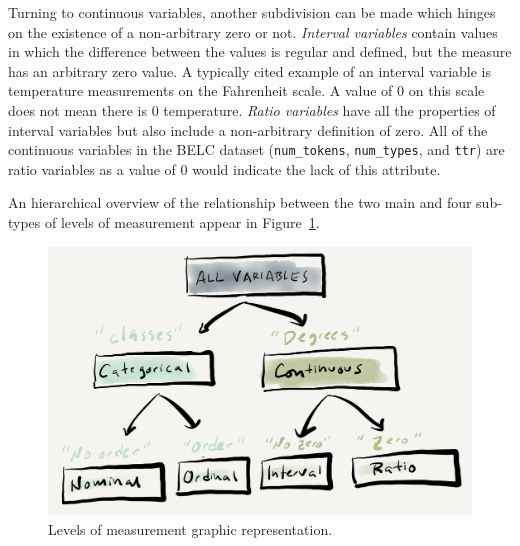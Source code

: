 \documentclass[
  letterpaper,
]{scrbook}
\begin{document}
Turning to continuous variables, another subdivision can be made which
hinges on the existence of a non-arbitrary zero or not. \emph{Interval
variables} contain values in which the difference between the values is
regular and defined, but the measure has an arbitrary zero value. A
typically cited example of an interval variable is temperature
measurements on the Fahrenheit scale. A value of 0 on this scale does
not mean there is 0 temperature. \emph{Ratio variables} have all the
properties of interval variables but also include a non-arbitrary
definition of zero. All of the continuous variables in the BELC dataset
(\texttt{num\_tokens}, \texttt{num\_types}, and \texttt{ttr}) are ratio
variables as a value of 0 would indicate the lack of this attribute.

An hierarchical overview of the relationship between the two main and
four sub-types of levels of measurement appear in
Figure~\ref{fig-info-values-paper}.

\begin{figure}[h]

{\centering \includegraphics[width=5.04in,height=\textheight]{./figures/approaching-analysis/Informational-values-paper.png}

}

\caption{\label{fig-info-values-paper}Levels of measurement graphic
representation.}

\end{figure}
\end{document}
